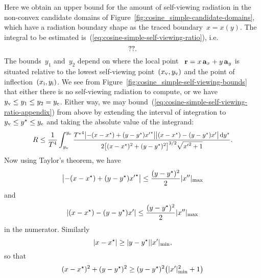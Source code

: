 Here we obtain an upper bound for the amount of self-viewing radiation
in the non-convex candidate domains
of Figure~\ref{fig:cosine_simple-candidate-domains},
which have a radiation boundary shape as the traced boundary~$x = x (y)$.
The integral to be estimated is~(\ref{eq:cosine-simple-self-viewing-ratio}),
i.e.
\begin{equation}
  \usecontent{eq:cosine-simple-self-viewing-ratio}.
  \label{eq:cosine-simple-self-viewing-ratio-appendix}
\end{equation}
The bounds~$y_1$ and~$y_2$ depend
on where the local point~%
$\boldsymbol{\mathbf{r}} = x \mathop{}\!\boldsymbol{\mathbf{a}}_{x} + y \mathop{}\!\boldsymbol{\mathbf{a}}_{y}$ is situated
relative to the lowest self-viewing point~$(x_{\mathrm{v}}, y_{\mathrm{v}})$
and the point of inflection~$(x_{\mathrm{i}}, y_{\mathrm{i}})$.
We see from Figure~\ref{fig:cosine_simple-self-viewing-bounds}
that either there is no self-viewing radiation to compute,
or we have~$y_{\mathrm{v}} \le y_1 \le y_2 = y_{\mathrm{e}}$.
Either way,
we may bound~(\ref{eq:cosine-simple-self-viewing-ratio-appendix}) from above
by extending the interval of integration to~$y_{\mathrm{v}} \le y^\star \le y_{\mathrm{e}}$
and taking the absolute value of the integrand:
\begin{equation}
  R \le
    \frac{1}{T^4}
    \int_{y_\view}^{y_\End}
      \smallerfrac{
        {T^\star}^4
        \abs[\big]{-(x - x^\star) + (y - y^\star) {x'}^\star}
        \abs[\big]{(x - x^\star) - (y - y^\star) x'}
        \td y^\star
      }{
        2
        \squarebr[\big]{(x - x^\star)^2 + (y - y^\star)^2}^{3/2}
        \sqrt{{x'}^2 + 1}
      }.
  \label{eq:cosine-simple-self-viewing-ratio-bound-limits}
\end{equation}
Now using Taylor's theorem, we have
\begin{equation}
  \abs*{-(x - x^\star) + (y - y^\star) {x'}^\star} \le
    \frac{(y - y^\star)^2}{2} \abs{x''}_{\max}
  \label{eq:taylor-second-order-remainder-upper-bound-starred}
\end{equation}
and
\begin{equation}
  \abs*{(x - x^\star) - (y - y^\star) x'} \le
    \frac{(y - y^\star)^2}{2} \abs{x''}_{\max}
  \label{eq:taylor-second-order-remainder-upper-bound}
\end{equation}
in the numerator.
Similarly
\begin{equation}
  \abs{x - x^\star} \ge \abs{y - y^\star} \abs{x'}_{\min},
  \label{eq:taylor-first-order-remainder-lower-bound}
\end{equation}
so that
\begin{equation}
  (x - x^\star)^2 + (y - y^\star)^2 \ge
    (y - y^\star)^2 \roundbr*{\abs{x'}_{\min}^2 + 1}
  \label{eq:displacement-squared-lower-bound}
\end{equation}
